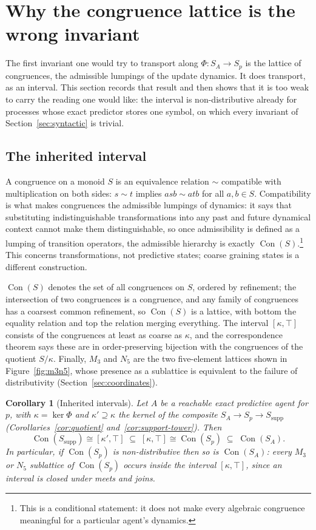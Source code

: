 \documentclass[10pt]{article}
\newtheorem{corollary}[theorem]{Corollary}
\theoremstyle{definition}
\theoremstyle{remark}
\newcommand{\Con}{\operatorname{Con}}
\begin{document}
\section{Why the congruence lattice is the wrong invariant}
\label{sec:congruence}

The first invariant one would try to transport along
$\Phi:S_A\to S_p$ is the lattice of congruences, the admissible
lumpings of the update dynamics.  It does transport, as an interval.
This section records that result and then shows that it is too weak
to carry the reading one would like: the interval is non-distributive
already for processes whose exact predictor stores one symbol, on
which every invariant of Section~\ref{sec:syntactic} is trivial.

\subsection{The inherited interval}

A congruence on a monoid $S$ is an equivalence relation
$\sim$ compatible with multiplication on both sides: $s\sim t$ implies
$asb\sim atb$ for all $a,b\in S$.  Compatibility is what makes
congruences the admissible lumpings of dynamics: it says that
substituting indistinguishable transformations into any past and future
dynamical context cannot make them distinguishable, so once
admissibility is defined as a lumping of transition operators, the
admissible hierarchy is exactly $\Con(S)$.\footnote{This is a
conditional statement: it does not make every algebraic congruence
meaningful for a particular agent's dynamics.}  This concerns
transformations, not predictive states; coarse graining states is a
different construction.

$\Con(S)$ denotes the set of all congruences on $S$, ordered by
refinement; the intersection of two congruences is a congruence, and any
family of congruences has a coarsest common refinement, so $\Con(S)$ is a
lattice, with bottom the equality relation and top the relation merging
everything.  The interval $[\kappa,\top]$ consists of the congruences at
least as coarse as $\kappa$, and the correspondence theorem says these are
in order-preserving bijection with the congruences of the quotient
$S/\kappa$.  Finally, $M_3$ and $N_5$ are the two five-element lattices shown in
Figure~\ref{fig:m3n5}, whose presence as a sublattice is equivalent to
the failure of distributivity (Section~\ref{sec:coordinates}).

\begin{corollary}[Inherited intervals]
\label{cor:con-inheritance}
Let $A$ be a reachable exact predictive agent for $p$, with
$\kappa=\ker\Phi$ and $\kappa'\supseteq\kappa$ the kernel of the
composite $S_A\to S_p\to S_{\mathrm{supp}}$
(Corollaries~\ref{cor:quotient} and~\ref{cor:support-tower}).  Then
\[
  \Con(S_{\mathrm{supp}})
  \cong[\kappa',\top]
  \;\subseteq\;
  [\kappa,\top]
  \cong\Con(S_p)
  \;\subseteq\;
  \Con(S_A).
\]
In particular, if $\Con(S_p)$ is non-distributive then so is
$\Con(S_A)$: every $M_3$ or $N_5$ sublattice of $\Con(S_p)$ occurs
inside the interval $[\kappa,\top]$, since an interval is closed under
meets and joins.
\end{corollary}
\end{document}
